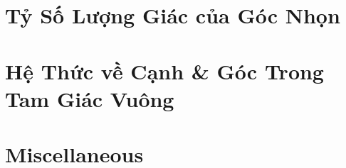 \documentclass{article}
\begin{document}

\section{Tỷ Số Lượng Giác của Góc Nhọn}


\section{Hệ Thức về Cạnh \& Góc Trong Tam Giác Vuông}


\section{Miscellaneous}


\printbibliography[heading=bibintoc]
	
	
\end{document}
